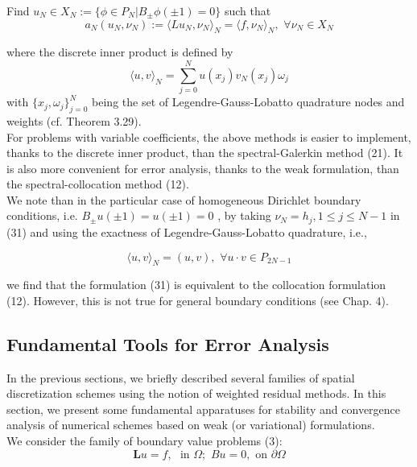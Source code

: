 \begin{center}
	Find $ u_{ N } \in X_{ N } := \{ \phi \in P_{ N } \vert B_{ \pm } \phi ( \pm 1) = 0 \} $ such that
	\begin{equation}
		a_{ N } \left( u_{ N }, \nu_{ N } \right) := \langle L u_{ N }, \nu_{ N } \rangle_{ N } = \langle f, \nu_{ N } \rangle_{ N }, \hspace{4pt} \forall \nu_{ N } \in X_{ N }
	\end{equation}
	
\end{center}
where the discrete inner product is defined by 
\begin{equation}
	\langle u,v \rangle_{ N } = \sum_{ j=0 }^{ N } u(x_{ j }) v_{ N } (x_{ j }) \omega_{ j }
\end{equation}
with $ \{ x_{ j }, \omega_{ j } \}_{ j=0 }^{ N } $ being the set of Legendre-Gauss-Lobatto quadrature nodes and weights (cf. Theorem 3.29). \\

\indent For problems with variable coefficients, the above methods is easier to implement, thanks to the discrete inner product, than the spectral-Galerkin method (21). It is also more convenient for error analysis, thanks to the weak formulation, than the spectral-collocation method (12). \\
\indent We note than in the particular case of homogeneous Dirichlet boundary conditions, i.e. $ B_{ \pm }u( \pm 1) = u(\pm 1) = 0 $ , by taking $ \nu_{ N } = h_{ j }, 1 \leq j \leq N-1 $ in (31) and using the exactness of Legendre-Gauss-Lobatto quadrature, i.e.,

\begin{equation}
	\langle u, v \rangle_{ N } = \left( u,v \right), \hspace{4pt} \forall u \cdot v \in P_{ 2N-1 }
\end{equation}

we find that the formulation (31) is equivalent to the collocation formulation (12). However, this is not true for general boundary conditions (see Chap. 4).

\subsection{Fundamental Tools for Error Analysis}

In the previous sections, we briefly described several families of spatial discretization schemes using the notion of weighted residual methods. In this section, we present some fundamental apparatuses for stability and convergence analysis of numerical schemes based on weak (or variational) formulations. \\
\indent We consider the family of boundary value problems (3):
\begin{equation}
	\mathbf{ L }u = f, \hspace{4pt} \text{ in } \Omega; \hspace{4pt} Bu = 0, \text{ on } \partial \Omega
\end{equation}

